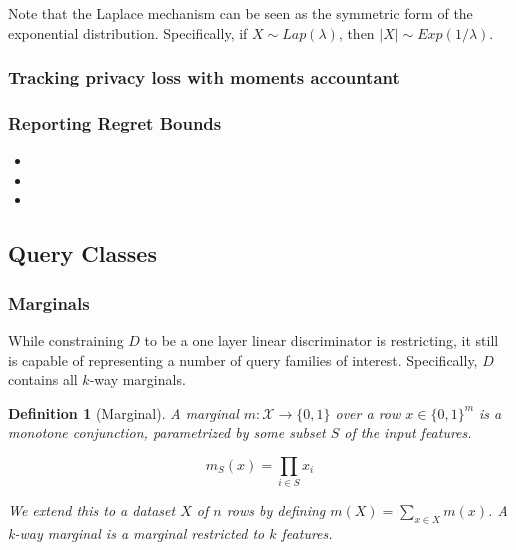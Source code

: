 \documentclass[]{article}
\newcommand{\X}{\mathcal{X}}
\newcommand{\B}{\{0,1\}}
\newtheorem{definition}{Definition}[section]
\theoremstyle{definition}
\begin{document}
Note that the Laplace mechanism can be seen as the symmetric form of the exponential distribution. Specifically, if $X \sim Lap(\lambda)$, then $|X| \sim Exp(1/\lambda)$. 


\subsubsection{Tracking privacy loss with moments accountant}




\subsubsection{Reporting Regret Bounds}
\begin{itemize}
    \item {}
    \item {}
    \item {}
\end{itemize}

\subsection{Query Classes}
\subsubsection{Marginals}

While constraining $D$ to be a one layer linear discriminator is restricting, it still is capable of representing a number of query families of interest. Specifically, $D$ contains all $k$-way marginals.

\begin{definition}[Marginal]
    A marginal $m: \X \to \B$ over a row $x \in \{0,1\}^m$ is a monotone conjunction, parametrized by some subset $S$ of the input features.  

    \begin{equation}
        m_S(x) = \prod_{i \in S} x_i
    \end{equation}
    
    We extend this to a dataset $X$ of $n$ rows by defining $m(X) = \sum_{x \in X} m(x)$. A k-way marginal is a marginal restricted to $k$ features.
\end{definition} \cite{DR13}
\end{document}
